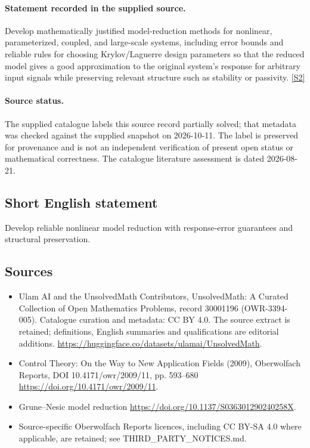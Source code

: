 \documentclass[11pt]{article}
\begin{document}
\paragraph{Statement recorded in the supplied source.}
Develop mathematically justified model-reduction methods for nonlinear, parameterized, coupled, and large-scale systems, including error bounds and reliable rules for choosing Krylov/Laguerre design parameters so that the reduced model gives a good approximation to the original system's response for arbitrary input signals while preserving relevant structure such as stability or passivity. \href{https://doi.org/10.4171/owr/2009/11}{[S2]}
\paragraph{Source status.}
The supplied catalogue labels this source record partially solved; that metadata was checked against the supplied snapshot on 2026-10-11. The label is preserved for provenance and is not an independent verification of present open status or mathematical correctness. The catalogue literature assessment is dated 2026-08-21.
\subsection{Short English statement}
Develop reliable nonlinear model reduction with response-error guarantees and structural preservation.
\subsection{Sources}
\begin{itemize}
\item[S1] Ulam AI and the UnsolvedMath Contributors, UnsolvedMath: A Curated Collection of Open Mathematics Problems, record 30001196 (OWR-3394-005). Catalogue curation and metadata: CC BY 4.0. The source extract is retained; definitions, English summaries and qualifications are editorial additions.
\url{https://huggingface.co/datasets/ulamai/UnsolvedMath}.
\item[S2] Control Theory: On the Way to New Application Fields (2009), Oberwolfach Reports, DOI 10.4171/owr/2009/11, pp. 593--680
\url{https://doi.org/10.4171/owr/2009/11}.
\item[S3] Grune--Nesic model reduction
\url{https://doi.org/10.1137/S036301290240258X}.
\item Source-specific Oberwolfach Reports licences, including CC BY-SA 4.0 where applicable, are retained; see THIRD\_PARTY\_NOTICES.md.
\end{itemize}
\end{document}

